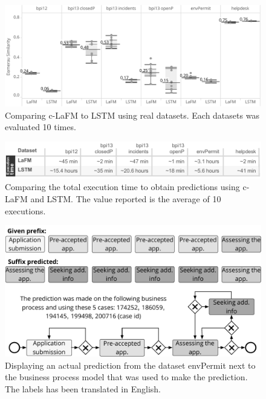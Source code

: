 \documentclass[runningheads]{llncs}
\begin{document}
\begin{figure}
\begin{center}
\includegraphics[width=1\columnwidth]{02-schema/results_real.pdf}
\caption{Comparing c-LaFM to LSTM using real datasets. Each datasets was evaluated 10 times. }
\label{c-LaFM}
\end{center}
\vspace{-20pt}
\end{figure}

\begin{figure}
\begin{center}
\includegraphics[width=1\columnwidth]{02-schema/time_real.pdf}
\caption{Comparing the total execution time to obtain predictions using c-LaFM and LSTM. The value reported is the average of 10 executions.}
\label{time_real}
\end{center}
\vspace{-20pt}
\end{figure}

\begin{figure}[H]
\begin{center}
\includegraphics[width=.8\columnwidth]{02-schema/illustration.pdf}
\caption{Displaying an actual prediction from the dataset envPermit next to the business process model that was used to make the prediction. The labels has been translated in English.}
\label{fig:illustration}
\end{center}
\vspace{-10pt}
\end{figure}
\end{document}
